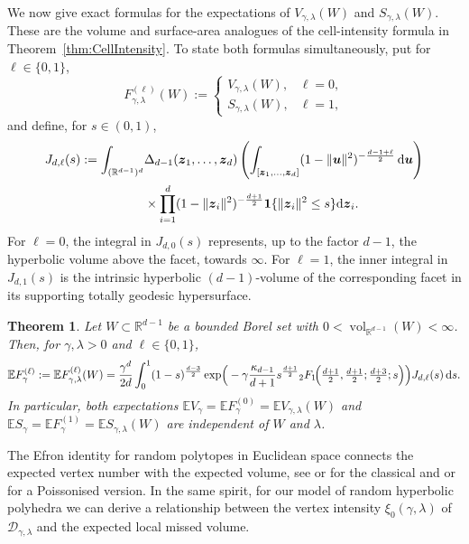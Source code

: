 \documentclass[11pt,a4paper]{article}
\theoremstyle{plain}
\newtheorem{theorem}{Theorem}
\theoremstyle{definition}
\theoremstyle{remark}
\newcommand{\dint}{\textup{d}}
\newcommand{\vol}{\mathop{\mathrm{vol}}\nolimits}
\newcommand{\bz}{\boldsymbol{z}}
\newcommand{\bu}{\boldsymbol{u}}
\def\EE{\mathbb{E}}
\def\RR{\mathbb{R}}
\def\cD{\mathcal{D}}
\begin{document}
We now give exact formulas for the expectations of
$V_{\gamma,\lambda}(W)$ and $S_{\gamma,\lambda}(W)$. These are the
volume and surface-area analogues of the cell-intensity formula in
Theorem~\ref{thm:CellIntensity}. To state both formulas simultaneously, put for $\ell\in\{0,1\}$,
\[
	F_{\gamma,\lambda}^{(\ell)}(W)
	:=
	\begin{cases}
		V_{\gamma,\lambda}(W), & \ell=0, \\
		S_{\gamma,\lambda}(W), & \ell=1,
	\end{cases}
\]
and define, for $s\in(0,1)$,
\begin{align*}
	J_{d,\ell}(s)
	:=
	\int_{(\RR^{d-1})^d}
	 & \Delta_{d-1}(\bz_1,\ldots,\bz_d)
	\left(
	\int_{[\bz_1,\ldots,\bz_d]}
		(1-\|\bu\|^2)^{-\frac{d-1+\ell}{2}}
	\,\dint\bu
	\right)                             \\
	 & \times\prod_{i=1}^d
	(1-\|\bz_i\|^2)^{-\frac{d+1}{2}}
		{\bf 1}\{\|\bz_i\|^2\le s\}\dint\bz_i.
\end{align*}
For $\ell=0$, the integral in $J_{d,0}(s)$ represents, up to the
factor $d-1$, the hyperbolic volume above the facet, towards $\infty$. For $\ell=1$, the inner integral in $J_{d,1}(s)$ is the
intrinsic hyperbolic $(d-1)$-volume of the corresponding facet in its
supporting totally geodesic hypersurface.


\begin{theorem}\label{thm:LocalVolume}
	Let $W\subset\RR^{d-1}$ be a bounded Borel set with
	$0<\vol_{\RR^{d-1}}(W)<\infty$. Then, for
	$\gamma,\lambda>0$ and $\ell\in\{0,1\}$,
	\[
		\EE F_{\gamma}^{(\ell)}:=\EE F_{\gamma,\lambda}^{(\ell)}(W)
		=
		\frac{\gamma^d}{2d}
		\int_0^1
		(1-s)^{\frac{d-3}{2}}
		\exp\!\Big(
		-\gamma\frac{\kappa_{d-1}}{d+1}
		s^{\frac{d+1}{2}}
		{}_2F_1\!\Big(
		\tfrac{d+1}{2},\tfrac{d+1}{2};
		\tfrac{d+3}{2};s
		\Big)
		\Big)
		J_{d,\ell}(s)\,\dint s.
	\]
	In particular, both expectations $\EE V_{\gamma}=\EE F_{\gamma}^{(0)}=\EE V_{\gamma,\lambda}(W)$ and $\EE S_{\gamma}=\EE F_{\gamma}^{(1)}=\EE S_{\gamma,\lambda}(W)$ are independent of $W$ and
	$\lambda$.
\end{theorem}


The Efron identity for random polytopes in Euclidean space connects the expected vertex number with the expected volume, see \cite[Equation (2.1)]{Reitzner2010} or \cite[Equation (8.12)]{SW} for the classical and \cite[Equation (3.1)]{HHRT2015} or \cite[Equation (15)]{BR:2015} for a Poissonised version. In the same spirit, for our model of random hyperbolic polyhedra we can derive a relationship between the vertex intensity $\xi_0(\gamma,\lambda)$ of $\cD_{\gamma,\lambda}$ and the expected local missed volume.
\end{document}
